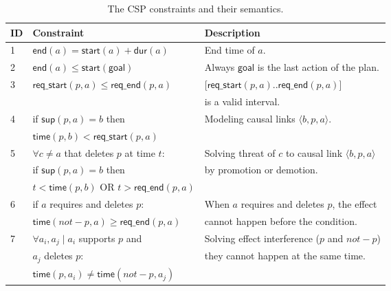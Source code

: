 \documentclass{ecai}
\newcommand{\tup}[1]{{\langle #1 \rangle}}
\newcommand{\dur}{\mathsf{dur}}    %
\newcommand{\start}{\mathsf{start}}%
\newcommand{\en}{\mathsf{end}}     %
\newcommand{\supp}{\mathsf{sup}}   %
\newcommand{\tim}{\mathsf{time}}   %
\newcommand{\reqs}{\mathsf{req\_{start}}} %
\newcommand{\reqe}{\mathsf{req\_{end}}}   %
\newcommand{\goal}{\mathsf{goal}}  %
\begin{document}
\begin{table}
\setlength\extrarowheight{2pt}    
\begin{tiny}
\begin{tabular}{lll}
{\bf ID}&{\bf Constraint}&{\bf Description}\\\hline

1&$\en(a)=\start(a)+\dur(a)$ & End time of $a$. \\

2&$\en(a) \leq \start(\goal)$ & Always $\goal$ is the last action of the plan. \\

3&$\reqs(p,a) \leq \reqe(p,a)$ & [$\reqs(p,a)..\reqe(p,a)$]\\
& & is a valid interval.\\

4&if $\supp(p,a)=b$ then & Modeling causal links $\tup{b,p,a}$.\\
&\hspace{1pt}$\tim(p,b) < \reqs(p,a)$ & \\

5& $\forall c \neq a$ that deletes $p$ at time $t$: & Solving threat of $c$ to causal link $\tup{b,p,a}$\\
&\hspace{1pt}if $\supp(p,a)=b$ then &  by promotion or demotion.\\
&\hspace{2pt}$t < \tim(p,b)$ OR $t > \reqe(p,a)$ & \\

6&if $a$ requires and deletes $p$: & When $a$ requires and deletes $p$, the effect \\
&\hspace{1pt}$\tim(not-p,a) \geq \reqe(p,a)$ & cannot happen before the condition.\\

7&$\forall a_i,a_j \mid a_i$ supports $p$ and & Solving effect interference ($p$ and $not-p$)\\
&\hspace{1pt}$a_j$ deletes $p$: & they cannot happen at the same time.\\
&\hspace{2pt}$\tim(p,a_i) \neq \tim(not-p,a_j)$ &
\end{tabular}
\end{tiny}
\caption{\small The CSP constraints and their semantics.}
\label{table:constraints}
\end{table}
\end{document}
